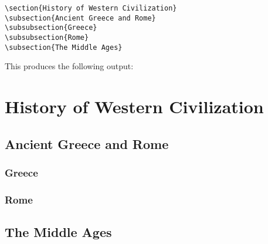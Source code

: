 \documentclass{article}
\begin{document}
\begin{verbatim}
\section{History of Western Civilization}
\subsection{Ancient Greece and Rome}
\subsubsection{Greece}
\subsubsection{Rome}
\subsection{The Middle Ages}
\end{verbatim}

This produces the following output: 
\section{History of Western Civilization}
\subsection{Ancient Greece and Rome}
\subsubsection{Greece}
\subsubsection{Rome}
\subsection{The Middle Ages}
\end{document}
